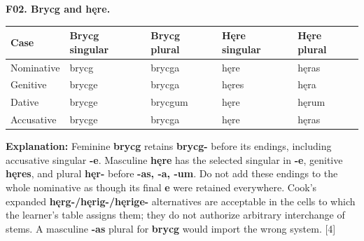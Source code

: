 \par\begin{minipage}{\linewidth}\raggedright
\textbf{F02. Brycg and hęre.}

\par\begingroup
\fontsize{10.5}{13.2}\selectfont
\setlength{\LTleft}{0pt}\setlength{\LTright}{\fill}
\noindent
\begin{tabular}{@{}>{\raggedright\arraybackslash}p{22.13mm}>{\raggedright\arraybackslash}p{23.68mm}>{\raggedright\arraybackslash}p{22.13mm}>{\raggedright\arraybackslash}p{22.68mm}>{\raggedright\arraybackslash}p{22.13mm}@{}}
\toprule
\textbf{Case} & \textbf{Brycg singular} & \textbf{Brycg plural} & \textbf{Hęre singular} & \textbf{Hęre plural} \\
\midrule
Nominative & brycg & brycga & hęre & hęras \\
Genitive & brycge & brycga & hęres & hęra \\
Dative & brycge & brycgum & hęre & hęrum \\
Accusative & brycge & brycga & hęre & hęras \\
\bottomrule
\end{tabular}
\par\endgroup

\textbf{Explanation:} Feminine \textbf{brycg} retains \textbf{brycg-} before its endings, including accusative singular \textbf{-e}. Masculine \textbf{hęre} has the selected singular in \textbf{-e}, genitive \textbf{hęres}, and plural \textbf{hęr-} before \textbf{-as, -a, -um}. Do not add these endings to the whole nominative as though its final \textbf{e} were retained everywhere. Cook's expanded \textbf{hęrg-/\allowbreak{}hęrig-/\allowbreak{}hęrige-} alternatives are acceptable in the cells to which the learner's table assigns them; they do not authorize arbitrary interchange of stems. A masculine \textbf{-as} plural for \textbf{brycg} would import the wrong system. [4]

\end{minipage}\par\addvspace{4pt}

